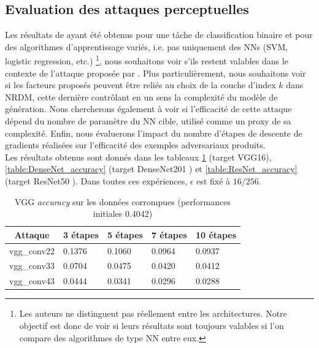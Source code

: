 \documentclass{article}
\begin{document}
\subsection{Evaluation des attaques perceptuelles}

Les résultats de \citet{Demontis2018WhyDA} ayant été obtenus pour une tâche de classification binaire et pour des algorithmes d'apprentissage variés, i.e. pas uniquement des NNs (SVM, logistic regression, etc.) \footnote{Les auteurs ne distinguent pas réellement entre les architectures. Notre objectif est donc de voir si leurs résultats sont toujours valables si l'on compare des algorithmes de type NN entre eux.}, nous souhaitons voir s'ils restent valables dans le contexte de l'attaque proposée par \citet{Naseer2018TaskgeneralizableAA}. Plus particulièrement, nous souhaitons voir si les facteurs proposés peuvent être reliés au choix de la couche d'index $k$ dans NRDM, cette dernière contrôlant en un sens la complexité du modèle de génération. Nous chercherons également à voir si l'efficacité de cette attaque dépend du nombre de paramètre du NN cible, utilisé comme un proxy de sa complexité. Enfin, nous évaluerons l'impact du nombre d'étapes de descente de gradients réalisées sur l'efficacité des exemples adversariaux produits.\\
Les résultats obtenus sont donnés dans les tableaux \ref{table:VGG_accuracy} (target VGG16), \ref{table:DenseNet_accuracy} (target DenseNet201 \cite{Huang2016DenselyCC}) et \ref{table:ResNet_accuracy} (target ResNet50 \cite{He2015DeepRL}). Dans toutes ces expériences, $\epsilon$ est fixé à $16/256$.

\begin{table}[!h]
\centering
\caption{VGG \textit{accuracy} sur les données corrompues (performances initiales 0.4042)}
\label{table:VGG_accuracy}
\begin{tabular}{|c|l|l|l|l|}
\hline
Attaque      & \multicolumn{1}{c|}{3 étapes} & \multicolumn{1}{c|}{5 étapes} & 7 étapes & 10 étapes \\ \hline
vgg\_conv22 & 0.1376                       & 0.1060                       & 0.0964  & 0.0937   \\ \hline
vgg\_conv33 & 0.0704                       & 0.0475                       & 0.0420  & 0.0412   \\ \hline
vgg\_conv43 & 0.0444                       & 0.0341                       & 0.0296  & 0.0288   \\ \hline
\end{tabular}
\end{table}
\end{document}
